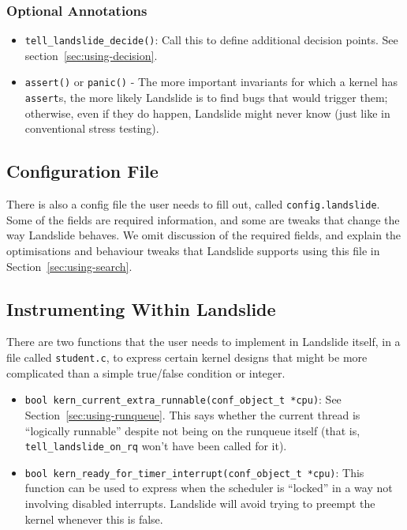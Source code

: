 \subsubsection{Optional Annotations}
\begin{itemize}
	\small
	\item \texttt{tell\_landslide\_decide()}: Call this to define additional decision points. See section~\ref{sec:using-decision}.
	\item \texttt{assert()} or \texttt{panic()} -
		The more important invariants for which a kernel has \texttt{assert}s, the more likely Landslide is to find bugs that would trigger them; otherwise, even if they do happen, Landslide might never know (just like in conventional stress testing).
\end{itemize}

\subsection{Configuration File}
\label{sec:using-config-landslide}

There is also a config file the user needs to fill out, called \texttt{config.landslide}. Some of the fields are required information, and some are tweaks that change the way Landslide behaves. We omit discussion of the required fields, and explain the optimisations and behaviour tweaks that Landslide supports using this file in Section~\ref{sec:using-search}.

\subsection{Instrumenting Within Landslide}
\label{sec:using-student-c}

There are two functions that the user needs to implement in Landslide itself, in a file called \texttt{student.c}, to express certain kernel designs that might be more complicated than a simple true/false condition or integer.

\begin{itemize}
	\small
        \item \texttt{bool kern\_current\_extra\_runnable(conf\_object\_t *cpu)}: See Section~\ref{sec:using-runqueue}. This says whether the current thread is ``logically runnable'' despite not being on the runqueue itself (that is, \texttt{tell\_landslide\_on\_rq} won't have been called for it).
        \item \texttt{bool kern\_ready\_for\_timer\_interrupt(conf\_object\_t *cpu)}: This function can be used to express when the scheduler is ``locked'' in a way not involving disabled interrupts. Landslide will avoid trying to preempt the kernel whenever this is false.
\end{itemize}

